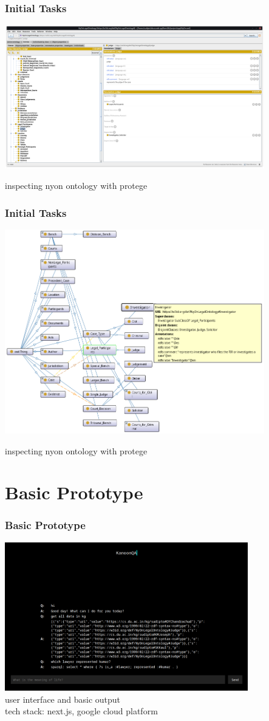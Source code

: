 \documentclass[t]{beamer}
\begin{document}
\begin{frame}
    \frametitle{Initial Tasks}

    \centering \includegraphics[width=320pt]{./Screenshot from 2023-02-03 10-43-34.png}
    
   \tiny{inspecting nyon ontology with protege}
\end{frame}

\begin{frame}
    \frametitle{Initial Tasks}

    \centering \includegraphics[width=320pt]{./Screenshot from 2023-02-03 10-50-31.png}
    
   \tiny{inspecting nyon ontology with protege}
\end{frame}

\section{Basic Prototype}
\begin{frame}
    \frametitle{Basic Prototype}

    \centering \includegraphics[width=300pt]{./Screenshot from 2023-02-03 10-34-36.png}\\
   \tiny{user interface and basic output\\tech stack: next.js, google cloud platform}
\end{frame}
\end{document}
